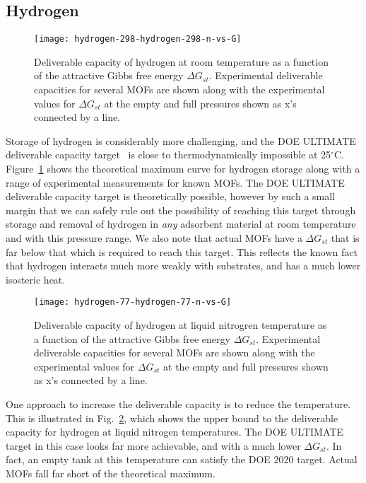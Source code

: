 \documentclass{nature}
\begin{document}
\subsection{Hydrogen}

\begin{figure}
    \centering
    \texttt{[image: hydrogen-298-hydrogen-298-n-vs-G]}
    \caption{Deliverable capacity of hydrogen at room temperature as a function of the attractive Gibbs free energy $\Delta G_{st}$.  Experimental deliverable capacities for several MOFs are shown along with the experimental values for $\Delta G_{st}$ at the empty and full pressures shown as x's connected by a line.}
    \label{fig:hydrogen-298-D}
\end{figure}

Storage of hydrogen is considerably more challenging, and the DOE ULTIMATE deliverable capacity target~\cite{DOE} is close to thermodynamically impossible at 25$^\circ$C.  Figure~\ref{fig:hydrogen-298-D} shows the theoretical maximum curve for hydrogen storage along with a range of experimental measurements for known MOFs.  The DOE ULTIMATE deliverable capacity target is theoretically possible, however by such a small margin that we can safely rule out the possibility of reaching this target through storage and removal of hydrogen in \emph{any} adsorbent material at room temperature and with this pressure range.  We also note that actual MOFs have a $\Delta G_{st}$ that is far below that which is required to reach this target.  This reflects the known fact that hydrogen interacts much more weakly with substrates, and has a much lower isosteric heat.

\begin{figure}
    \centering
    \texttt{[image: hydrogen-77-hydrogen-77-n-vs-G]}
    \caption{Deliverable capacity of hydrogen at liquid nitrogren temperature as a function of the attractive Gibbs free energy $\Delta G_{st}$.  Experimental deliverable capacities for several MOFs are shown along with the experimental values for $\Delta G_{st}$ at the empty and full pressures shown as x's connected by a line.}
    \label{fig:hydrogen-77-D}
\end{figure}

One approach to increase the deliverable capacity is to reduce the temperature.  This is illustrated in Fig.~\ref{fig:hydrogen-77-D}, which shows the upper bound to the deliverable capacity for hydrogen at liquid nitrogen temperatures.  The DOE ULTIMATE target in this case looks far more achievable, and with a much lower $\Delta G_{st}$.  In fact, an empty tank at this temperature can satisfy the DOE 2020 target.  Actual MOFs fall far short of the theoretical maximum.
\end{document}
